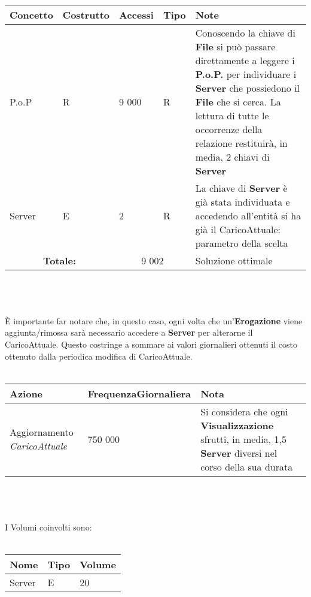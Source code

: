 \documentclass{article}
\begin{document}
\begin{tabular}{|m{1.7cm}|m{1.7cm}|m{1.3cm}|m{0.8cm}|m{5.1cm}|}
\hline
    \textbf{Concetto} & \textbf{Costrutto} & \textbf{Accessi} & \textbf{Tipo} & \textbf{Note} \\
\hline
    P.o.P & R & 9 000 & R & Conoscendo la chiave di \textbf{File} si può passare direttamente a leggere i \textbf{P.o.P.} per individuare i \textbf{Server} che possiedono il \textbf{File} che si cerca. La lettura di tutte le occorrenze della relazione restituirà, in media, 2 chiavi di \textbf{Server} \\
\hline
    Server & E & 2 & R & La chiave di \textbf{Server} è già stata individuata e accedendo all'entità si ha già il CaricoAttuale: parametro della scelta \\
\hline
    \multicolumn{2}{|c|}{\textbf{Totale:}} & 
    \multicolumn{2}{c|}{9 002} & 
    Soluzione ottimale \\ 
\hline
\end{tabular}
\\ \\ \\ 
È importante far notare che, in questo caso, ogni volta che un'\textbf{Erogazione} viene aggiunta/rimossa sarà necessario accedere a \textbf{Server} per alterarne il CaricoAttuale. Questo costringe a sommare ai valori giornalieri ottenuti il costo ottenuto dalla periodica modifica di CaricoAttuale. \\ \\ 
\begin{tabular}{|C{2.2cm}|C{3.8cm}|C{4.4cm}|}
\hline
    \textbf{Azione} & \textbf{FrequenzaGiornaliera} & \textbf{Nota} \\
\hline
Aggiornamento \textit{CaricoAttuale} & 750 000 & Si considera che ogni \textbf{Visualizzazione} sfrutti, in media, 1,5 \textbf{Server} diversi nel corso della sua durata \\
\hline
\end{tabular} \\ \\ \\
I Volumi coinvolti sono: \\ \\ 
\begin{tabular}{|C{2.6cm}|C{2.6cm}|C{2.6cm}|}
\hline
    \textbf{Nome} & \textbf{Tipo} & \textbf{Volume} \\
\hline
 Server & E & 20 \\
\hline
\end{tabular} \\ \\ 
\end{document}
